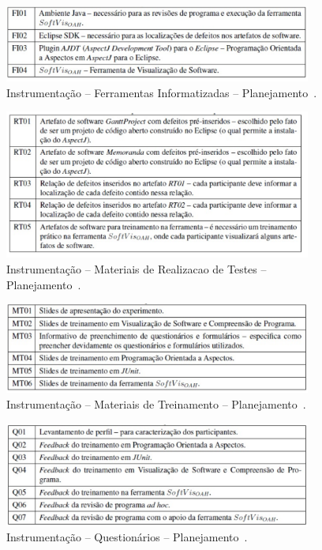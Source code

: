 \begin{figure}[!htb]
\centering
\includegraphics[width=0.9\textwidth]{images/tabela-instrumentacao1.png}
\caption{Instrumentação – Ferramentas Informatizadas – Planejamento~\cite{d2012avaliaccao}.}
\label{img:instrumentacao1}
\end{figure}

\begin{figure}[!htb]
\centering
\includegraphics[width=0.9\textwidth]{images/tabela-instrumentacao2.png}
\caption{Instrumentação – Materiais de Realizacao de Testes – Planejamento~\cite{d2012avaliaccao}.}
\label{img:instrumentacao2}
\end{figure}

\begin{figure}[!htb]
\centering
\includegraphics[width=0.9\textwidth]{images/tabela-instrumentacao3.png}
\caption{Instrumentação – Materiais de Treinamento – Planejamento~\cite{d2012avaliaccao}.}
\label{img:instrumentacao3}
\end{figure}

\begin{figure}[!htb]
\centering
\includegraphics[width=0.9\textwidth]{images/tabela-instrumentacao4.png}
\caption{Instrumentação – Questionários – Planejamento~\cite{d2012avaliaccao}.}
\label{img:instrumentacao4}
\end{figure}

